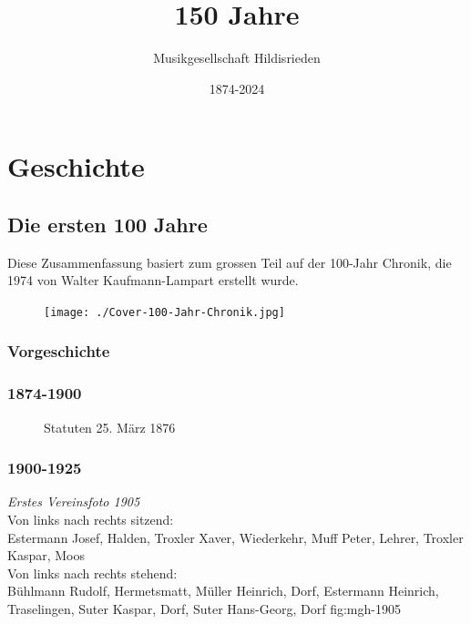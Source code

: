 \documentclass[]{book}
\title{150 Jahre}
\author{Musikgesellschaft Hildisrieden}
\date{1874-2024}
\begin{document}
\frontmatter
\maketitle

\tableofcontents


\mainmatter

\part{Geschichte}
\chapter{Die ersten 100 Jahre}

Diese Zusammenfassung basiert zum grossen Teil auf der 100-Jahr Chronik, die 1974 von Walter Kaufmann-Lampart erstellt wurde.
\begin{figure}[ht]
    \texttt{[image: ./Cover-100-Jahr-Chronik.jpg]}
\end{figure}
\section{Vorgeschichte}



\section{1874-1900}

\begin{figure}[ht]
    \centering
    \hfil
    \caption{Statuten 25. März 1876}
    \label{fig:Statuten-1874}
\end{figure}


\clearpage

\section{1900-1925}


{\emph{Erstes Vereinsfoto 1905}\\
    Von links nach rechts sitzend:\\
    Estermann Josef, Halden, Troxler Xaver, Wiederkehr, Muff Peter, Lehrer,
    Troxler Kaspar, Moos\\
    Von links nach rechts stehend:\\
    Bühlmann Rudolf, Hermetsmatt, Müller Heinrich, Dorf, Estermann Heinrich,
    Traselingen, Suter Kaspar, Dorf, Suter Hans-Georg, Dorf} {fig:mgh-1905}
\end{document}
